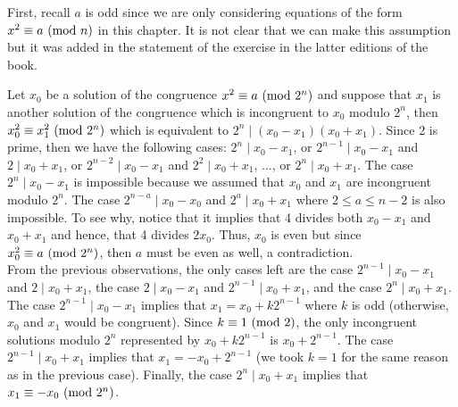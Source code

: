 \begin{solution}
    First, recall $a$ is odd since we are only considering equations of the form $x^2 \equiv a \ (\mathrm{mod}\ n)$ in this chapter. It is not clear that we can make this assumption but it was added in the statement of the exercise in the latter editions of the book.
    
    Let $x_0$ be a solution of the congruence $x^2 \equiv a \ (\mathrm{mod}\ 2^n)$ and suppose that $x_1$ is another solution of the congruence which is incongruent to $x_0$ modulo $2^n$, then $x_0^2 \equiv x_1^2 \ (\mathrm{mod}\ 2^n)$ which is equivalent to $2^n \mid (x_0 - x_1)(x_0 + x_1)$. Since 2 is prime, then we have the following cases: $2^n \mid x_0 - x_1$, or $2^{n-1} \mid x_0 - x_1$ and $2 \mid x_0 + x_1$, or $2^{n-2} \mid x_0 - x_1$ and $2^2 \mid x_0 + x_1$, ..., or $2^n \mid x_0 + x_1$. The case $2^n \mid x_0 - x_1$ is impossible because we assumed that $x_0$ and $x_1$ are incongruent modulo $2^n$. The case $2^{n-a} \mid x_0 - x_0$ and $2^a \mid x_0 + x_1$ where $2 \leq a \leq n - 2$ is also impossible. To see why, notice that it implies that 4 divides both $x_0 - x_1$ and $x_0 + x_1$ and hence, that 4 divides $2x_0$. Thus, $x_0$ is even but since $x_0^2 \equiv a \ (\mathrm{mod}\ 2^n)$, then $a$ must be even as well, a contradiction.\\
    
    From the previous observations, the only cases left are the case $2^{n-1} \mid x_0 - x_1$ and $2 \mid x_0 + x_1$, the case $2 \mid x_0 - x_1$ and $2^{n-1} \mid x_0 + x_1$, and the case $2^n \mid x_0 + x_1$. The case $2^{n-1} \mid x_0 - x_1$ implies that $x_1 = x_0 + k2^{n-1}$ where $k$ is odd (otherwise, $x_0$ and $x_1$ would be congruent). Since $k \equiv 1 \ (\mathrm{mod}\ 2)$, the only incongruent solutions modulo $2^n$ represented by $x_0 + k2^{n-1}$ is $x_0 + 2^{n-1}$. The case $2^{n-1} \mid x_0 + x_1$ implies that $x_1 = -x_0 + 2^{n-1}$ (we took $k = 1$ for the same reason as in the previous case). Finally, the case $2^n \mid x_0 + x_1$ implies that $x_1 \equiv -x_0 \ (\mathrm{mod}\ 2^n)$.\\
    

\end{solution}
